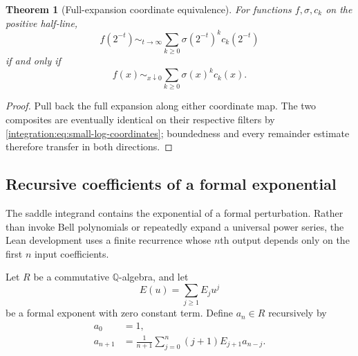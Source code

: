 \documentclass[11pt,oneside]{article}
\newtheorem{theorem}{Theorem}[section]
\theoremstyle{definition}
\theoremstyle{remark}
\newcommand{\Q}{\mathbb Q}
\begin{document}
\begin{theorem}[Full-expansion coordinate equivalence]
\label{integration:thm:small-log-expansion-equivalence}
For functions $f,\sigma,c_k$ on the positive half-line,
\begin{equation}
 f(2^{-t})\sim_{t\to\infty}
 \sum_{k\ge0}\sigma(2^{-t})^kc_k(2^{-t})
 \label{integration:eq:log-coordinate-expansion}
\end{equation}
if and only if
\begin{equation}
 f(x)\sim_{x\downarrow0}
 \sum_{k\ge0}\sigma(x)^kc_k(x).
 \label{integration:eq:small-coordinate-expansion}
\end{equation}
\end{theorem}

\begin{proof}
Pull back the full expansion along either coordinate map.  The two composites are eventually
identical on their respective filters by \eqref{integration:eq:small-log-coordinates}; boundedness and
every remainder estimate therefore transfer in both directions.
\end{proof}

\subsection{Recursive coefficients of a formal exponential}
\label{integration:sec:exp-coeff}

The saddle integrand contains the exponential of a formal perturbation.  Rather than invoke
Bell polynomials or repeatedly expand a universal power series, the Lean development uses a
finite recurrence whose $n$th output depends only on the first $n$ input coefficients.

Let $R$ be a commutative $\Q$-algebra, and let
\begin{equation}
 E(u)=\sum_{j\ge1}E_j u^j
 \label{integration:eq:formal-exponent}
\end{equation}
be a formal exponent with zero constant term.  Define $a_n\in R$ recursively by
\begin{align}
 a_0&=1,                                                    \label{integration:eq:expcoeff-zero}\\
 a_{n+1}&=\frac1{n+1}\sum_{j=0}^{n}(j+1)E_{j+1}a_{n-j}.
                                                               \label{integration:eq:expcoeff-recurrence}
\end{align}
\end{document}
